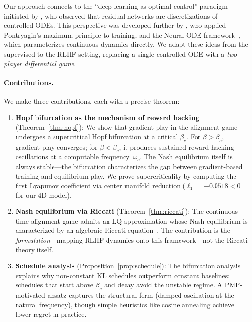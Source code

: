 \documentclass[10pt]{article}
\begin{document}
Our approach connects to the ``deep learning as optimal control'' paradigm initiated by \citet{e2017proposal}, who observed that residual networks are discretizations of controlled ODEs.
This perspective was developed further by \citet{li2018optimal}, who applied Pontryagin's maximum principle to training, and the Neural ODE framework~\citep{chen2018neural}, which parameterizes continuous dynamics directly.
We adapt these ideas from the supervised to the RLHF setting, replacing a single controlled ODE with a \emph{two-player differential game}.

\paragraph{Contributions.}
We make three contributions, each with a precise theorem:
\begin{enumerate}[leftmargin=1.5em,itemsep=1pt,topsep=2pt]
  \item \textbf{Hopf bifurcation as the mechanism of reward hacking} (Theorem~\ref{thm:hopf}): We show that gradient play in the alignment game undergoes a supercritical Hopf bifurcation at a critical $\beta_c$.
    For $\beta > \beta_c$, gradient play converges; for $\beta < \beta_c$, it produces sustained reward-hacking oscillations at a computable frequency~$\omega_c$.
    The Nash equilibrium itself is always stable---the bifurcation characterizes the gap between gradient-based training and equilibrium play.
    We prove supercriticality by computing the first Lyapunov coefficient via center manifold reduction ($\ell_1 = -0.0518 < 0$ for our 4D model).
  \item \textbf{Nash equilibrium via Riccati} (Theorem~\ref{thm:riccati}): The continuous-time alignment game admits an LQ approximation whose Nash equilibrium is characterized by an algebraic Riccati equation~\citep{basar1999dynamic}.
    The contribution is the \emph{formulation}---mapping RLHF dynamics onto this framework---not the Riccati theory itself.
  \item \textbf{Schedule analysis} (Proposition~\ref{prop:schedule}): The bifurcation analysis explains why non-constant KL schedules outperform constant baselines: schedules that start above $\beta_c$ and decay avoid the unstable regime.
    A PMP-motivated ansatz captures the structural form (damped oscillation at the natural frequency), though simple heuristics like cosine annealing achieve lower regret in practice.
\end{enumerate}
\end{document}
